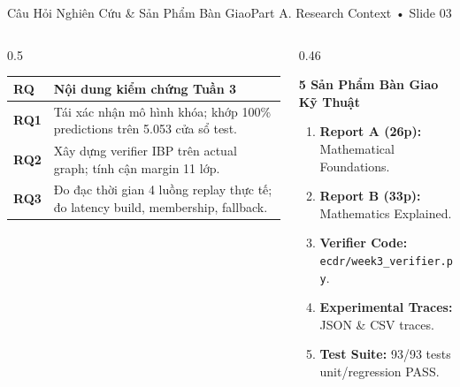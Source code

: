 \documentclass[aspectratio=169, 10pt]{beamer}
\begin{document}
\begin{frame}{Câu Hỏi Nghiên Cứu \& Sản Phẩm Bàn Giao}{Part A. Research Context • Slide 03}
    \begin{columns}
        \begin{column}{0.5\textwidth}
            \small
            \begin{tabular}{lp{4.8cm}}
                \toprule
                \textbf{RQ} & \textbf{Nội dung kiểm chứng Tuần 3} \\
                \midrule
                \textbf{RQ1} & Tái xác nhận mô hình khóa; khớp 100\% predictions trên 5.053 cửa sổ test. \\
                \textbf{RQ2} & Xây dựng verifier IBP trên actual graph; tính cận margin 11 lớp. \\
                \textbf{RQ3} & Đo đạc thời gian 4 luồng replay thực tế; đo latency build, membership, fallback. \\
                \bottomrule
            \end{tabular}
        \end{column}
        \begin{column}{0.46\textwidth}
            \begin{block}{\textbf{5 Sản Phẩm Bàn Giao Kỹ Thuật}}
                \footnotesize
                \begin{enumerate}
                    \item \textbf{Report A (26p):} Mathematical Foundations.
                    \item \textbf{Report B (33p):} Mathematics Explained.
                    \item \textbf{Verifier Code:} \texttt{ecdr/week3\_verifier.py}.
                    \item \textbf{Experimental Traces:} JSON \& CSV traces.
                    \item \textbf{Test Suite:} 93/93 tests unit/regression PASS.
                \end{enumerate}
            \end{block}
        \end{column}
    \end{columns}
\end{frame}
\end{document}
